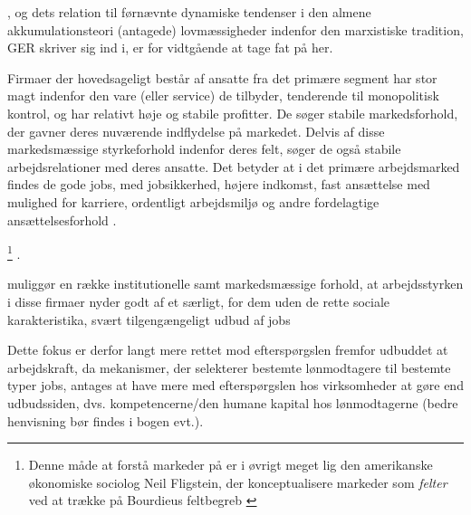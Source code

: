 , og dets relation til førnævnte dynamiske tendenser i den almene akkumulationsteori (antagede) lovmæssigheder indenfor den marxistiske tradition, GER skriver sig ind i, er for vidtgående at tage fat på her. 












Firmaer der hovedsageligt består af ansatte fra det primære segment har stor magt indenfor den vare (eller service) de tilbyder, tenderende til monopolitisk kontrol, og har relativt høje og stabile profitter. De søger stabile markedsforhold, der gavner deres nuværende indflydelse på markedet. Delvis af disse markedsmæssige styrkeforhold indenfor deres felt, søger de også stabile arbejdsrelationer med deres ansatte. Det betyder at i det primære arbejdsmarked findes de gode jobs, med jobsikkerhed, højere indkomst, fast ansættelse med mulighed for karriere, ordentligt arbejdsmiljø og andre fordelagtige ansættelsesforhold \parencite[28]{Drago1995}.




%
%
\footnote{Denne måde at forstå markeder på er i øvrigt meget lig den amerikanske økonomiske sociolog Neil Fligstein, der konceptualisere markeder som \emph{felter} ved at trække på Bourdieus feltbegreb \textcite{Fligstein2001}}%
%
.


 


muliggør en række institutionelle samt markedsmæssige forhold, at arbejdsstyrken i disse firmaer nyder godt af et særligt, for dem uden de rette sociale karakteristika, svært tilgengængeligt udbud af jobs 










Dette fokus er derfor langt mere rettet mod efterspørgslen fremfor udbuddet at arbejdskraft, da mekanismer, der selekterer bestemte lønmodtagere til bestemte typer jobs, antages at have mere med efterspørgslen hos virksomheder at gøre end udbudssiden, dvs. kompetencerne/den humane kapital hos lønmodtagerne \parencite[33]{Boje1985} (bedre henvisning bør findes i bogen evt.). 









